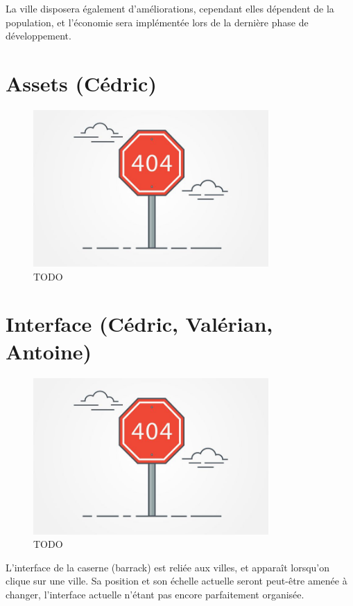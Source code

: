 \documentclass[12pt]{report}
\begin{document}
La ville disposera également d’améliorations, cependant elles dépendent de la population, et l’économie sera implémentée lors de la dernière phase de développement.

\section{Assets (Cédric)}

\begin{figure}[H]
    \centering
    \includegraphics[width=0.8\textwidth]{404}
    \caption{TODO}
\end{figure}

\section{Interface (Cédric, Valérian, Antoine)}

\begin{figure}[H]
    \centering
    \includegraphics[width=0.8\textwidth]{404}
    \caption{TODO}
\end{figure}

L’interface de la caserne (barrack) est reliée aux villes, et apparaît lorsqu’on clique sur une ville. Sa position et son échelle actuelle seront peut-être amenée à changer, l’interface actuelle n’étant pas encore parfaitement organisée. 
\end{document}
